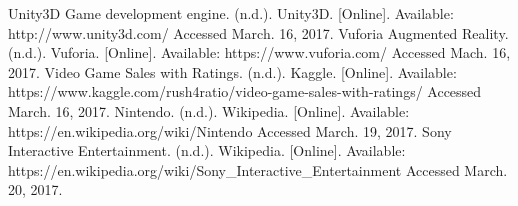 

%
%

\begin{thebibliography}{1}
  Unity3D Game development engine. (n.d.). Unity3D. [Online]. Available:
  http://www.unity3d.com/
  Accessed March. 16, 2017.
  Vuforia Augmented Reality. (n.d.). Vuforia. [Online]. Available:
  https://www.vuforia.com/
  Accessed Mach. 16, 2017.
  Video Game Sales with Ratings. (n.d.). Kaggle. [Online]. Available:
  https://www.kaggle.com/rush4ratio/video-game-sales-with-ratings/
  Accessed March. 16, 2017.
  Nintendo. (n.d.). Wikipedia. [Online]. Available:
  https://en.wikipedia.org/wiki/Nintendo
  Accessed March. 19, 2017.
  Sony Interactive Entertainment. (n.d.). Wikipedia. [Online]. Available:
  https://en.wikipedia.org/wiki/Sony\_Interactive\_Entertainment
  Accessed March. 20, 2017.
\end{thebibliography}
